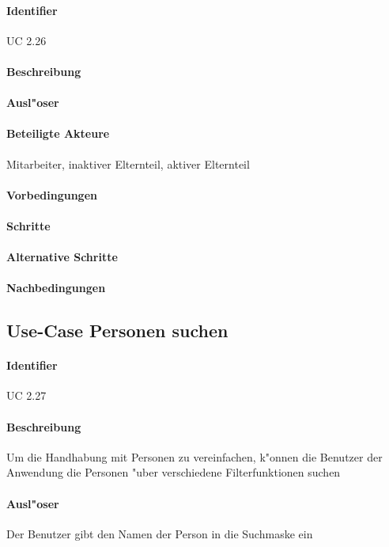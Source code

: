   \paragraph{Identifier}
  UC 2.26
  \paragraph{Beschreibung}
  \paragraph{Ausl"oser}
  \paragraph{Beteiligte Akteure}   \leavevmode \newline
    Mitarbeiter, inaktiver Elternteil, aktiver Elternteil
  \paragraph{Vorbedingungen}
  \paragraph{Schritte}
  \paragraph{Alternative Schritte}
  \paragraph{Nachbedingungen}

  
  \newpage
 \subsection{Use-Case Personen suchen}
  \paragraph{Identifier}
  UC 2.27
  \paragraph{Beschreibung}
  Um die Handhabung mit Personen zu vereinfachen, k"onnen die Benutzer der Anwendung die Personen "uber verschiedene Filterfunktionen suchen
  \paragraph{Ausl"oser}
  Der Benutzer gibt den Namen der Person in die Suchmaske ein
